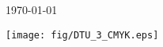\begin{titlepage}

{\large \today }\\[2cm] %

\vspace{4cm}
\begin{center}
\texttt{[image: fig/DTU\_3\_CMYK.eps]}
\end{center}
 

\vfill %

\end{titlepage}
